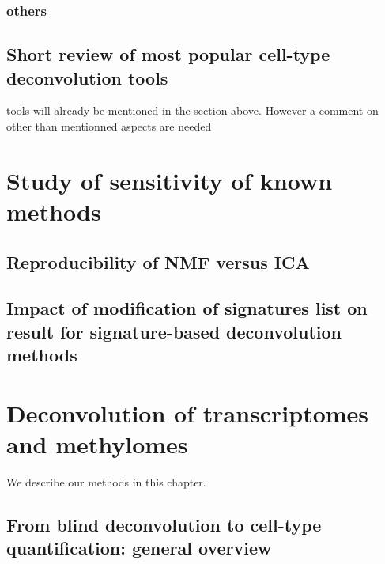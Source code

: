 \documentclass[12pt,]{book}
\theoremstyle{definition}
\theoremstyle{definition}
\theoremstyle{definition}
\theoremstyle{remark}
\begin{document}
\hypertarget{others}{%
\subsection{others}\label{others}}

\hypertarget{short-review-of-most-popular-cell-type-deconvolution-tools}{%
\section{Short review of most popular cell-type deconvolution
tools}\label{short-review-of-most-popular-cell-type-deconvolution-tools}}

tools will already be mentioned in the section above. However a comment
on other than mentionned aspects are needed

\hypertarget{study-of-sensitivity-of-known-methods}{%
\chapter{Study of sensitivity of known
methods}\label{study-of-sensitivity-of-known-methods}}

\hypertarget{reproducibility-of-nmf-versus-ica}{%
\section{Reproducibility of NMF versus
ICA}\label{reproducibility-of-nmf-versus-ica}}

\hypertarget{impact-of-modification-of-signatures-list-on-result-for-signature-based-deconvolution-methods}{%
\section{Impact of modification of signatures list on result for
signature-based deconvolution
methods}\label{impact-of-modification-of-signatures-list-on-result-for-signature-based-deconvolution-methods}}

\hypertarget{deconvolution-of-transcriptomes-and-methylomes}{%
\chapter{Deconvolution of transcriptomes and
methylomes}\label{deconvolution-of-transcriptomes-and-methylomes}}

We describe our methods in this chapter.

\hypertarget{from-blind-deconvolution-to-cell-type-quantification-general-overview}{%
\section{From blind deconvolution to cell-type quantification: general
overview}\label{from-blind-deconvolution-to-cell-type-quantification-general-overview}}
\end{document}
